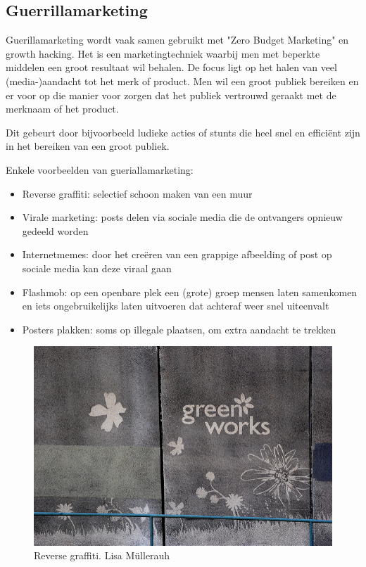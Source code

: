 \subsection{Guerrillamarketing}
\label{sec:guerrillamarketing}
Guerillamarketing wordt vaak samen gebruikt met "Zero Budget Marketing" en growth hacking. Het is een marketingtechniek waarbij men met beperkte middelen een groot resultaat wil behalen. De focus ligt op het halen van veel (media-)aandacht tot het merk of product. Men wil een groot publiek bereiken en er voor op die manier voor zorgen dat het publiek vertrouwd geraakt met de merknaam of het product.

Dit gebeurt door bijvoorbeeld ludieke acties of stunts die heel snel en efficiënt zijn in het bereiken van een groot publiek. 

Enkele voorbeelden van gueriallamarketing:
 
\begin{itemize}
	\item Reverse graffiti: selectief schoon maken van een muur 
	\item Virale marketing: posts delen via sociale media die de ontvangers opnieuw gedeeld worden
	\item Internetmemes: door het creëren van een grappige afbeelding of post op sociale media kan deze viraal gaan
	\item Flashmob: op een openbare plek een (grote) groep mensen laten samenkomen en iets ongebruikelijks laten uitvoeren dat achteraf weer snel uiteenvalt
	\item Posters plakken: soms op illegale plaatsen, om extra aandacht te trekken
\end{itemize}

\begin{figure}[h!]
	\includegraphics[width=\linewidth]{img/reverse-graffiti.jpg}
	\centering
	\caption{Reverse graffiti. \textcopyright  Lisa Müllerauh}
	\label{fig:defGrowthHacker}
\end{figure}

